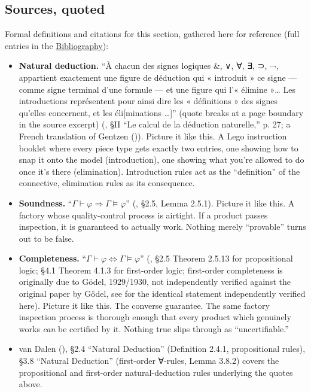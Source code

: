 \subsection{Sources, quoted}\label{sec:04-propositions-and-proofs:02-logic-recap:8}

Formal definitions and citations for this section, gathered here for reference (full entries in the \hyperref[sec:root:bibliography:1]{Bibliography}):

\begin{itemize}
\tightlist
\item
  \textbf{Natural deduction.} ``À chacun des signes logiques \&, ∨, ∀, ∃, ⊃, ¬, appartient exactement une figure de déduction qui « introduit » ce signe --- comme signe terminal d'une formule --- et une figure qui l'« élimine »\ldots{} Les introductions représentent pour ainsi dire les « définitions » des signes qu'elles concernent, et les éli{[}minations \ldots{]}'' (quote breaks at a page boundary in the source excerpt) (\cite{FeysLadriere1955}, §II ``Le calcul de la déduction naturelle,'' p. 27; a French translation of Gentzen (\cite{Gentzen1935})). Picture it like this. A Lego instruction booklet where every piece type gets exactly two entries, one showing how to snap it onto the model (introduction), one showing what you're allowed to do once it's there (elimination). Introduction rules act as the ``definition'' of the connective, elimination rules as its consequence.
\item
  \textbf{Soundness.} ``\(\Gamma \vdash \varphi \Rightarrow \Gamma \models
  \varphi\)'' (\cite{VanDalen2013}, §2.5, Lemma 2.5.1). Picture it like this. A factory whose quality-control process is airtight. If a product passes inspection, it is guaranteed to actually work. Nothing merely ``provable'' turns out to be false.
\item
  \textbf{Completeness.} ``\(\Gamma \vdash \varphi \Leftrightarrow \Gamma
  \models \varphi\)'' (\cite{VanDalen2013}, §2.5 Theorem 2.5.13 for propositional logic; §4.1 Theorem 4.1.3 for first-order logic; first-order completeness is originally due to Gödel, 1929/1930, not independently verified against the original paper by Gödel, see \cite{VanDalen2013} for the identical statement independently verified here). Picture it like this. The converse guarantee. The same factory inspection process is thorough enough that every product which genuinely works \emph{can} be certified by it. Nothing true slips through as ``uncertifiable.''
\item
  van Dalen (\cite{VanDalen2013}), §2.4 ``Natural Deduction'' (Definition 2.4.1, propositional rules), §3.8 ``Natural Deduction'' (first-order ∀-rules, Lemma 3.8.2) covers the propositional and first-order natural-deduction rules underlying the quotes above.

\end{itemize}
